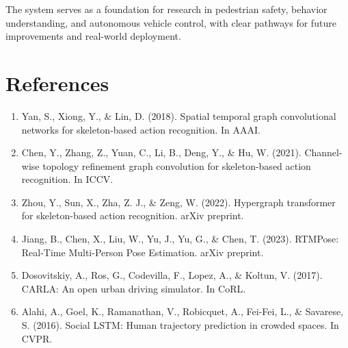 \documentclass[11pt,a4paper]{article}
\begin{document}
The system serves as a foundation for research in pedestrian safety, behavior understanding, and autonomous vehicle control, with clear pathways for future improvements and real-world deployment.

\section{References}

\begin{enumerate}
    \item Yan, S., Xiong, Y., \& Lin, D. (2018). Spatial temporal graph convolutional networks for skeleton-based action recognition. In AAAI.
    
    \item Chen, Y., Zhang, Z., Yuan, C., Li, B., Deng, Y., \& Hu, W. (2021). Channel-wise topology refinement graph convolution for skeleton-based action recognition. In ICCV.
    
    \item Zhou, Y., Sun, X., Zha, Z. J., \& Zeng, W. (2022). Hypergraph transformer for skeleton-based action recognition. arXiv preprint.
    
    \item Jiang, B., Chen, X., Liu, W., Yu, J., Yu, G., \& Chen, T. (2023). RTMPose: Real-Time Multi-Person Pose Estimation. arXiv preprint.
    
    \item Dosovitskiy, A., Ros, G., Codevilla, F., Lopez, A., \& Koltun, V. (2017). CARLA: An open urban driving simulator. In CoRL.
    
    \item Alahi, A., Goel, K., Ramanathan, V., Robicquet, A., Fei-Fei, L., \& Savarese, S. (2016). Social LSTM: Human trajectory prediction in crowded spaces. In CVPR.
\end{enumerate}
\end{document}
